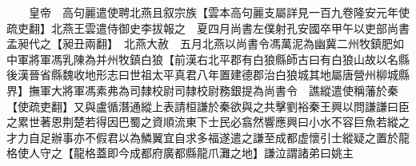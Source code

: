 　　皇帝　高句麗遣使聘北燕且叙宗族【雲本高句麗支屬詳見一百九卷隆安元年使疏吏翻】北燕王雲遣侍御史李拔報之　夏四月尚書左僕射孔安國卒甲午以吏部尚書孟昶代之【昶丑兩翻】　北燕大赦　五月北燕以尚書令馮萬泥為幽冀二州牧鎮肥如中軍將軍馮乳陳為并州牧鎮白狼【前漢右北平郡有白狼縣師古曰有白狼山故以名縣後漢晉省縣魏收地形志曰世祖太平真君八年置建德郡治白狼城其地屬唐營州柳城縣界】撫軍大將軍馮素弗為司隸校尉司隸校尉務銀提為尚書令　譙縱遣使稱藩於秦【使疏吏翻】又與盧循潛通縱上表請桓謙於秦欲與之共擊劉裕秦王興以問謙謙曰臣之累世著恩荆楚若得因巴蜀之資順流東下士民必翕然響應興曰小水不容巨魚若縱之才力自足辦事亦不假君以為鱗翼宜自求多福遂遣之謙至成都虚懷引士縱疑之置於龍格使人守之【龍格蓋即今成都府廣都縣龍爪灘之地】謙泣謂諸弟曰姚主